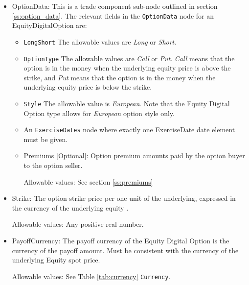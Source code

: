 \begin{itemize}
\item OptionData: This is a trade component sub-node outlined in section \ref{ss:option_data}. The relevant fields in the \lstinline!OptionData! node for an EquityDigitalOption are:

\begin{itemize}
\item \lstinline!LongShort! The allowable values are \emph{Long} or \emph{Short}.

\item \lstinline!OptionType! The allowable values are \emph{Call} or \emph{Put}.  \emph{Call} means that the option is in the money when the underlying equity price is above the strike, and \emph{Put} means that the option is in the money when the underlying equity price is below the strike.

\item  \lstinline!Style! The allowable value is \emph{European}. Note that the Equity Digital Option type allows for \emph{European} option style only.
%
%

\item An \lstinline!ExerciseDates! node where exactly one ExerciseDate date element must be given. 

\item Premiums [Optional]: Option premium amounts paid by the option buyer to the option seller.

Allowable values:  See section \ref{ss:premiums}

\end{itemize}

\item Strike: The option strike price per one unit of the underlying, expressed in the currency of the underlying equity .

Allowable values:  Any positive real number.

\item PayoffCurrency: The payoff currency of the Equity Digital Option is the currency of the payoff amount. Must be consistent with the currency of the underlying Equity spot price.  

Allowable values:  See Table \ref{tab:currency} \lstinline!Currency!.


\end{itemize}

